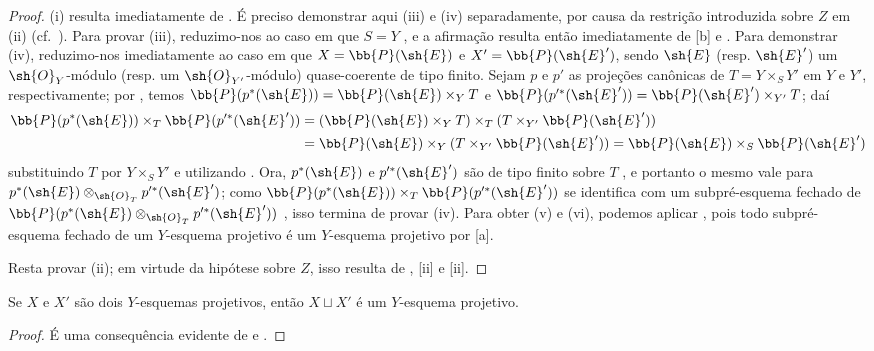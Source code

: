 \documentclass[oneside,10pt]{amsart}
\let\EGAOriginalLabel\label
\renewcommand{\label}[1]{\phantomsection\EGAOriginalLabel{#1}}
\begin{document}
\begin{proof}
(i) resulta imediatamente de .
É preciso demonstrar aqui (iii) e (iv) separadamente, por causa da restrição introduzida sobre $Z$ em (ii) (cf.~).
Para provar (iii), reduzimo-nos ao caso em que $S=Y$ , e a afirmação resulta então imediatamente de [b] e .
Para demonstrar (iv), reduzimo-nos imediatamente ao caso em que $X=\bb{P}(\sh{E})$ e $X'=\bb{P}(\sh{E}')$, sendo $\sh{E}$ (resp. $\sh{E}'$) um $\sh{O}_Y$-módulo (resp. um $\sh{O}_{Y'}$-módulo) quase-coerente de tipo finito.
Sejam $p$ e $p'$ as projeções canônicas de $T=Y\times_S Y'$ em $Y$ e $Y'$, respectivamente; por , temos $\bb{P}(p^*(\sh{E}))=\bb{P}(\sh{E})\times_Y T$ e $\bb{P}(p^{\prime *}(\sh{E}'))=\bb{P}(\sh{E}')\times_{Y'}T$; daí
\begin{align*}
  \bb{P}(p^*(\sh{E}))\times_T\bb{P}(p^{\prime *}(\sh{E}'))&=(\bb{P}(\sh{E})\times_Y T)\times_T(T\times_{Y'}\bb{P}(\sh{E}'))\\
                                               &=\bb{P}(\sh{E})\times_Y(T\times_{Y'}\bb{P}(\sh{E}'))=\bb{P}(\sh{E})\times_S\bb{P}(\sh{E}')
\end{align*}
substituindo $T$ por $Y\times_S Y'$ e utilizando .
Ora, $p^*(\sh{E})$ e $p^{\prime *}(\sh{E}')$ são de tipo finito sobre $T$ , e portanto o mesmo vale para $p^*(\sh{E})\otimes_{\sh{O}_T}p^{\prime *}(\sh{E}')$;
como $\bb{P}(p^*(\sh{E}))\times_T\bb{P}(p^{\prime *}(\sh{E}'))$ se identifica com um subpré-esquema fechado de $\bb{P}(p^*(\sh{E})\otimes_{\sh{O}_T}p^{\prime *}(\sh{E}'))$ , isso termina de provar (iv).
Para obter (v) e (vi), podemos aplicar , pois todo subpré-esquema fechado de um $Y$-esquema projetivo é um $Y$-esquema projetivo por [a].

Resta provar (ii); em virtude da hipótese sobre $Z$, isso resulta de , [ii] e [ii].
\end{proof}

\begin{proposition}[5.5.6]
\label{II.5.5.6}
Se $X$ e $X'$ são dois $Y$-esquemas projetivos, então $X\sqcup X'$ é um $Y$-esquema projetivo.
\end{proposition}

\begin{proof}
É uma consequência evidente de  e .
\end{proof}
\end{document}
